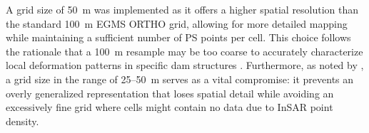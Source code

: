 \documentclass[11pt,a4paper]{article}
\begin{document}
A grid size of 50~m was implemented as it offers a higher spatial resolution than the standard 100~m EGMS ORTHO grid, allowing for more detailed mapping while maintaining a sufficient number of PS points per cell. This choice follows the rationale that a 100~m resample may be too coarse to accurately characterize local deformation patterns in specific dam structures \parencite{ruiz-armenteros2023}. Furthermore, as noted by \textcite{cernuto2026}, a grid size in the range of 25--50~m serves as a vital compromise: it prevents an overly generalized representation that loses spatial detail while avoiding an excessively fine grid where cells might contain no data due to InSAR point density.




\end{document}
